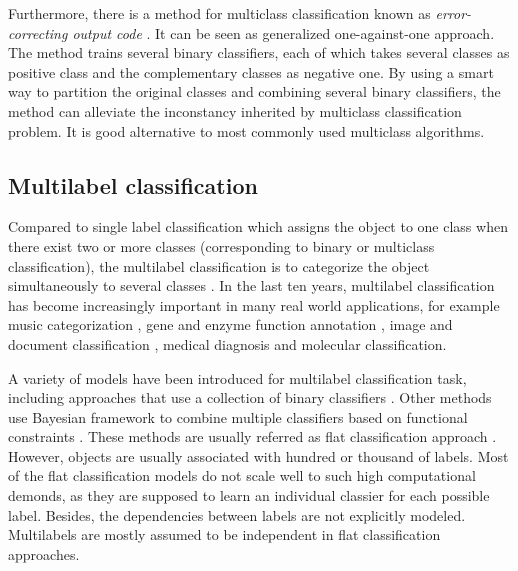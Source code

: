 \documentclass[english]{tktltiki}
\begin{document}
Furthermore, there is a method for multiclass classification known as {\em error-correcting output code} \cite{allwein00}. It can be seen as generalized one-against-one approach. The method trains several binary classifiers, each of which takes several classes as positive class and the complementary classes as negative one. By using a smart way to partition the original classes and combining several binary classifiers, the method can alleviate the inconstancy inherited by multiclass classification problem. It is good alternative to most commonly used multiclass algorithms. 




\subsection{Multilabel classification}


Compared to single label classification which assigns the object to one class when there exist two or more classes (corresponding to binary or multiclass classification), the multilabel classification is to categorize the object simultaneously to several classes \cite{ghamrawi05}. In the last ten years, multilabel classification has become increasingly important in many real world applications, for example music categorization \cite{juan03}, gene and enzyme function annotation \cite{barutcuoglu06, astikainen08}, image and document classification \cite{ghamrawi05}, medical diagnosis \cite{huang10} and molecular classification. 

A variety of models have been introduced for multilabel classification task, including approaches that use a collection of binary classifiers \cite{ghamrawi05, juan03, xiao07}. Other methods use Bayesian framework to combine multiple classifiers based on functional constraints \cite{barutcuoglu06, huang10}. These methods are usually referred as flat classification approach \cite{silla10}. However, objects are usually associated with hundred or thousand of labels. Most of the flat classification models do not scale well to such high computational demonds, as they are supposed to learn an individual classier for each possible label. Besides, the dependencies between labels are not explicitly modeled. Multilabels are mostly assumed to be independent in flat classification approaches.
\end{document}
